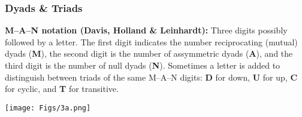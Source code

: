 \documentclass{beamer}
\begin{document}
\begin{frame}
\frametitle{Dyads \& Triads}
\scriptsize
{\bf{M--A--N notation (Davis, Holland \& Leinhardt):}} Three digits possibly followed by a letter.  The first digit indicates the number reciprocating (mutual) dyads ({\bf{M}}),  the second digit is the number of assymmetric dyads ({\bf{A}}),  and the third digit is the number of null dyads ({\bf{N}}).  Sometimes a letter is added to distinguish between triads of the same M--A--N digits: {\bf{D}} for down, {\bf{U}} for up, {\bf{C}} for cyclic,  and {\bf{T}} for transitive.
\begin{center}
\texttt{[image: Figs/3a.png]} \hspace*{4cm}
\end{center}

\end{frame}
\end{document}
